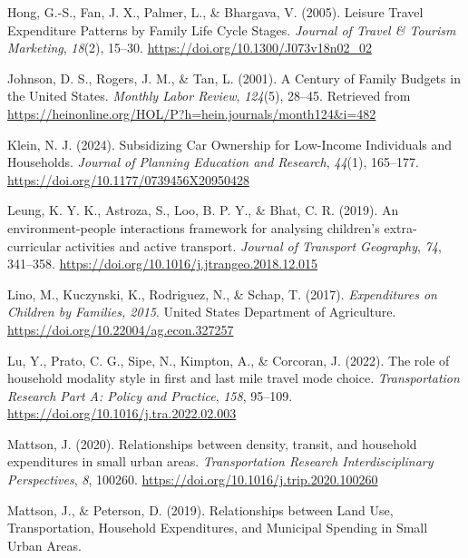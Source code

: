 \documentclass[
]{agujournal2019}
\newlength{\cslhangindent}
\newenvironment{CSLReferences}[2] %
 {\begin{list}{}{%
  \setlength{\itemindent}{0pt}
  \setlength{\leftmargin}{0pt}
  \setlength{\parsep}{0pt}
  \ifodd #1
   \setlength{\leftmargin}{\cslhangindent}
   \setlength{\itemindent}{-1\cslhangindent}
  \fi
  \setlength{\itemsep}{#2\baselineskip}}}
 {\end{list}}
\begin{document}
\begin{CSLReferences}{1}{0}
Hong, G.-S., Fan, J. X., Palmer, L., \& Bhargava, V. (2005). Leisure
{Travel} {Expenditure} {Patterns} by {Family} {Life} {Cycle} {Stages}.
\emph{Journal of Travel \& Tourism Marketing}, \emph{18}(2), 15--30.
\url{https://doi.org/10.1300/J073v18n02_02}

Johnson, D. S., Rogers, J. M., \& Tan, L. (2001). A {Century} of
{Family} {Budgets} in the {United} {States}. \emph{Monthly Labor
Review}, \emph{124}(5), 28--45. Retrieved from
\url{https://heinonline.org/HOL/P?h=hein.journals/month124&i=482}

Klein, N. J. (2024). Subsidizing {Car} {Ownership} for {Low}-{Income}
{Individuals} and {Households}. \emph{Journal of Planning Education and
Research}, \emph{44}(1), 165--177.
\url{https://doi.org/10.1177/0739456X20950428}

Leung, K. Y. K., Astroza, S., Loo, B. P. Y., \& Bhat, C. R. (2019). An
environment-people interactions framework for analysing children's
extra-curricular activities and active transport. \emph{Journal of
Transport Geography}, \emph{74}, 341--358.
\url{https://doi.org/10.1016/j.jtrangeo.2018.12.015}

Lino, M., Kuczynski, K., Rodriguez, N., \& Schap, T. (2017).
\emph{Expenditures on {Children} by {Families}, 2015}. United States
Department of Agriculture. \url{https://doi.org/10.22004/ag.econ.327257}

Lu, Y., Prato, C. G., Sipe, N., Kimpton, A., \& Corcoran, J. (2022). The
role of household modality style in first and last mile travel mode
choice. \emph{Transportation Research Part A: Policy and Practice},
\emph{158}, 95--109. \url{https://doi.org/10.1016/j.tra.2022.02.003}

Mattson, J. (2020). Relationships between density, transit, and
household expenditures in small urban areas. \emph{Transportation
Research Interdisciplinary Perspectives}, \emph{8}, 100260.
\url{https://doi.org/10.1016/j.trip.2020.100260}

Mattson, J., \& Peterson, D. (2019). Relationships between {Land} {Use},
{Transportation}, {Household} {Expenditures}, and {Municipal} {Spending}
in {Small} {Urban} {Areas}.


\end{CSLReferences}
\end{document}
